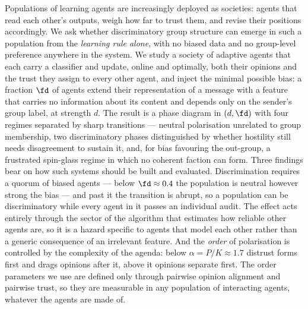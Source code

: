 Populations of learning agents are increasingly deployed as societies: agents that
read each other's outputs, weigh how far to trust them, and revise their positions
accordingly. We ask whether discriminatory group structure can emerge in such a
population from the \emph{learning rule alone}, with no biased data and no
group-level preference anywhere in the system. We study a society of adaptive
agents that each carry a classifier and update, online and optimally, both their
opinions and the trust they assign to every other agent, and inject the minimal
possible bias: a fraction $\fd$ of agents extend their representation of a message
with a feature that carries no information about its content and depends only on
the sender's group label, at strength $d$. The result is a phase diagram in
$(d,\fd)$ with four regimes separated by sharp transitions --- neutral polarisation
unrelated to group membership, two discriminatory phases distinguished by whether
hostility still needs disagreement to sustain it, and, for bias favouring the
out-group, a frustrated spin-glass regime in which no coherent faction can form.
Three findings bear on how such systems should be built and evaluated.
Discrimination requires a quorum of biased agents --- below $\fd\approx0.4$ the
population is neutral however strong the bias --- and past it the transition is
abrupt, so a population can be discriminatory while every agent in it passes an
individual audit. The effect acts entirely through the sector of the algorithm
that estimates how reliable other agents are, so it is a hazard specific to agents
that model each other rather than a generic consequence of an irrelevant feature.
And the \emph{order} of polarisation is controlled by the complexity of the agenda:
below $\alpha = P/K \approx 1.7$ distrust forms first and drags opinions after it,
above it opinions separate first. The order parameters we use are defined only
through pairwise opinion alignment and pairwise trust, so they are measurable in
any population of interacting agents, whatever the agents are made of.
